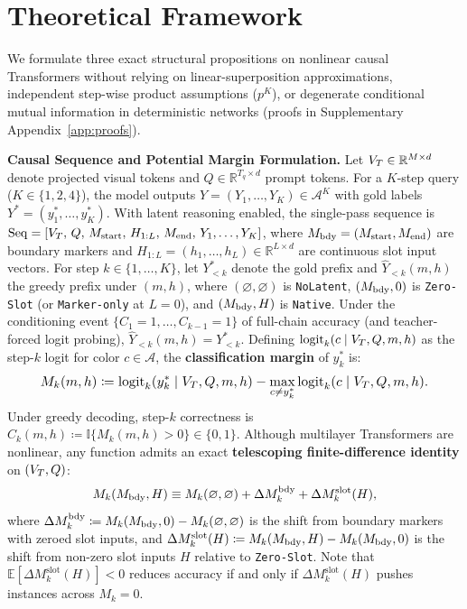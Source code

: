 \section{Theoretical Framework}
\label{sec:theory}

We formulate three exact structural propositions on nonlinear causal Transformers without relying on linear-superposition approximations, independent step-wise product assumptions ($p^K$), or degenerate conditional mutual information in deterministic networks (proofs in Supplementary Appendix~\ref{app:proofs}).

\textbf{Causal Sequence and Potential Margin Formulation.}
\label{subsec:prelim}
Let $V_T \in \mathbb{R}^{M \times d}$ denote projected visual tokens and $Q \in \mathbb{R}^{T_q \times d}$ prompt tokens. For a $K$-step query ($K \in \{1, 2, 4\}$), the model outputs $Y = (Y_1, \dots, Y_K) \in \mathcal{A}^K$ with gold labels $Y^* = (y_1^*, \dots, y_K^*)$. With latent reasoning enabled, the single-pass sequence is $\mathrm{Seq} = [V_T,\, Q,\, M_{\mathrm{start}},\, H_{1:L},\, M_{\mathrm{end}},\, Y_1, \dots, Y_K]$, where $M_{\mathrm{bdy}} = (M_{\mathrm{start}}, M_{\mathrm{end}})$ are boundary markers and $H_{1:L} = (h_1, \dots, h_L) \in \mathbb{R}^{L \times d}$ are continuous slot input vectors.
For step $k \in \{1, \dots, K\}$, let $Y^*_{<k}$ denote the gold prefix and $\hat{Y}_{<k}(m, h)$ the greedy prefix under $(m, h)$, where $(\varnothing, \varnothing)$ is \texttt{NoLatent}, $(M_{\mathrm{bdy}}, 0)$ is \texttt{Zero-Slot} (or \texttt{Marker-only} at $L=0$), and $(M_{\mathrm{bdy}}, H)$ is \texttt{Native}. Under the conditioning event $\{C_1 = 1, \dots, C_{k-1} = 1\}$ of full-chain accuracy (and teacher-forced logit probing), $\hat{Y}_{<k}(m, h) = Y^*_{<k}$. Defining $\mathrm{logit}_k(c \mid V_T, Q, m, h)$ as the step-$k$ logit for color $c \in \mathcal{A}$, the \textbf{classification margin} of $y_k^*$ is:
\begin{equation}
  \resizebox{0.89\linewidth}{!}{$\displaystyle M_k(m, h) \coloneqq \mathrm{logit}_k(y_k^* \mid \VT, Q, m, h) - \max_{c \neq y_k^*} \mathrm{logit}_k(c \mid \VT, Q, m, h).$}
  \label{eq:margin}
\end{equation}
Under greedy decoding, step-$k$ correctness is $C_k(m, h) \coloneqq \mathbb{I}\{M_k(m, h) > 0\} \in \{0, 1\}$. Although multilayer Transformers are nonlinear, any function admits an exact \textbf{telescoping finite-difference identity} on $(V_T, Q)$:
\begin{equation}
  M_k(M_{\mathrm{bdy}}, H) \equiv M_k(\varnothing, \varnothing) + \Delta M_k^{\mathrm{bdy}} + \Delta M_k^{\mathrm{slot}}(H),
  \label{eq:telescope}
\end{equation}
where $\Delta M_k^{\mathrm{bdy}} \coloneqq M_k(M_{\mathrm{bdy}}, 0) - M_k(\varnothing, \varnothing)$ is the shift from boundary markers with zeroed slot inputs, and $\Delta M_k^{\mathrm{slot}}(H) \coloneqq M_k(M_{\mathrm{bdy}}, H) - M_k(M_{\mathrm{bdy}}, 0)$ is the shift from non-zero slot inputs $H$ relative to \texttt{Zero-Slot}. Note that $\mathbb{E}[\Delta M_k^{\mathrm{slot}}(H)] < 0$ reduces accuracy if and only if $\Delta M_k^{\mathrm{slot}}(H)$ pushes instances across $M_k = 0$.

